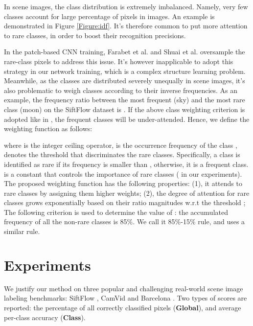 \documentclass[10pt,twocolumn,letterpaper]{article}
\begin{document}
In scene images, the class distribution is extremely imbalanced. Namely, very few classes account for large percentage of pixels in images. An example is demonstrated in Figure \ref{Figure:idf}. It's therefore common to put more attention to rare classes, in order to boost their recognition precisions.

In the patch-based CNN training, Farabet et al. \cite{farabet2013learning} and Shuai et al. \cite{shuai2015integrating} oversample the rare-class pixels to address this issue. It's however inapplicable to adopt this strategy in our network training, which is a complex structure learning problem.
Meanwhile, as the classes are distributed severely unequally in scene images, it's also problematic to weigh classes according to their inverse frequencies. As an example, the frequency ratio between the most frequent (sky) and the most rare class (moon) on the SiftFlow dataset is .  If the above class weighting criterion is adopted like in \cite{mostajabi2015feedforward}, the frequent classes will be under-attended.  Hence, we define the weighting function  as follows:

where  is the integer ceiling operator,  is the occurrence frequency of the class ,  denotes the threshold that discriminates the rare classes. Specifically, a class is identified as rare if its frequency is smaller than , otherwise, it is a frequent class.  is a constant that controls the importance of rare classes ( in our experiments). The proposed weighting function has the following properties: (1), it attends to rare classes by assigning them higher weights; (2), the degree of attention for rare classes grows exponentially based on their ratio magnitudes w.r.t the threshold ;
The following criterion is used to determine the value of : the accumulated frequency of  all the non-rare classes is 85\%. We call it 85\%-15\% rule, and \cite{yang2014context} uses a similar rule.




\section{Experiments}
\label{Section:experiments}
We justify our method on three popular and challenging real-world scene image labeling benchmarks: SiftFlow \cite{liu2009nonparametric}, CamVid \cite{BrostowSFC:ECCV08} and Barcelona \cite{tighe2010superparsing}. Two types of scores are reported: the percentage of all correctly classified pixels (\textbf{Global}), and average per-class accuracy (\textbf{Class}).
\end{document}
